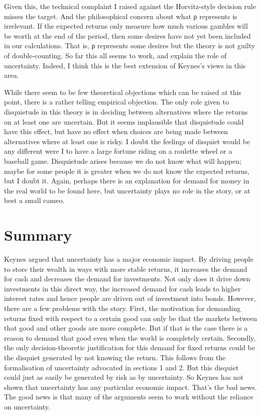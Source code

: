 \documentclass[
  11pt,
  letterpaper,
  DIV=11,
  numbers=noendperiod,
  twoside]{scrartcl}
\begin{document}
Given this, the technical complaint I raised against the Horvitz-style
decision rule misses the target. And the philosophical concern about
what ρ represents is irrelevant. If the expected returns only measure
how much various gambles will be worth at the end of the period, then
some desires have not yet been included in our calculations. That is, ρ
represents some desires but the theory is not guilty of double-counting.
So far this all seems to work, and explain the role of uncertainty.
Indeed, I think this is the best extension of Keynes's views in this
area.

While there seem to be few theoretical objections which can be raised at
this point, there is a rather telling empirical objection. The only role
given to disquietude in this theory is in deciding between alternatives
where the returns on at least one are uncertain. But it seems
implausible that disquietude could have this effect, but have no effect
when choices are being made between alternatives where at least one is
risky. I doubt the feelings of disquiet would be any different were I to
have a large fortune riding on a roulette wheel or a baseball game.
Disquietude arises because we do not know what will happen; maybe for
some people it is greater when we do not know the expected returns, but
I doubt it. Again, perhaps there is an explanation for demand for money
in the real world to be found here, but uncertainty plays no role in the
story, or at best a small cameo.

\section{Summary}\label{summary}

Keynes argued that uncertainty has a major economic impact. By driving
people to store their wealth in ways with more stable returns, it
increases the demand for cash and decreases the demand for investments.
Not only does it drive down investments in this direct way, the
increased demand for cash leads to higher interest rates and hence
people are driven out of investment into bonds. However, there are a few
problems with the story. First, the motivation for demanding returns
fixed with respect to a certain good can only be that the markets
between that good and other goods are more complete. But if that is the
case there is a reason to demand that good even when the world is
completely certain. Secondly, the only decision-theoretic justification
for this demand for fixed returns could be the disquiet generated by not
knowing the return. This follows from the formalisation of uncertainty
advocated in sections 1 and 2. But this disquiet could just as easily be
generated by risk as by uncertainty. So Keynes has not shown that
uncertainty has any particular economic impact. That's the bad news. The
good news is that many of the arguments seem to work without the
reliance on uncertainty.
\end{document}
